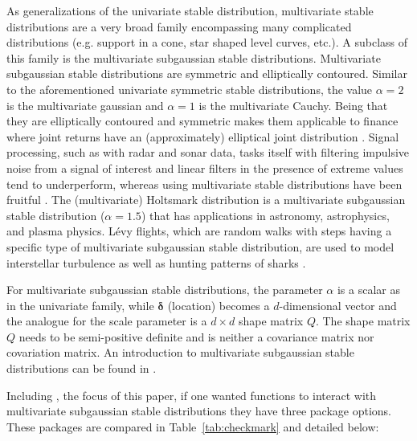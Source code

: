 As generalizations of the univariate stable distribution, multivariate
stable distributions are a very broad family encompassing many
complicated distributions (e.g. support in a cone, star shaped level
curves, etc.).  A subclass of this family is the
multivariate subgaussian stable distributions. Multivariate
subgaussian stable distributions are symmetric and elliptically
contoured.  Similar to the aforementioned univariate symmetric stable
distributions, the value $\alpha=2$ is the multivariate gaussian and
$\alpha=1$ is the multivariate Cauchy.  Being that they are
elliptically contoured and symmetric makes them applicable to finance
where joint returns have an (approximately) elliptical joint
distribution \citep{nolan2020univariate}.  Signal processing, such as
with radar and sonar data, tasks itself with filtering impulsive noise
from a signal of interest and linear filters in the presence of
extreme values tend to underperform, whereas using multivariate stable
distributions have been fruitful \citep{tsakalides1998deviation,
  nolan2013multivariate}.  The (multivariate) Holtsmark distribution
is a multivariate subgaussian stable distribution ($\alpha=1.5$) that
has applications in astronomy, astrophysics, and plasma
physics. L{\'e}vy flights, which are random walks with steps having a
specific type of multivariate subgaussian stable distribution, are
used to model interstellar turbulence as well as hunting patterns of
sharks \citep{boldyrev2003levy, sims2008scaling}.


For multivariate subgaussian stable distributions, the parameter
$\alpha$ is a scalar as in the univariate family, while
$\boldsymbol{\delta}$ (location) becomes a $d$-dimensional vector and
the analogue for the scale parameter is a $d \times d$ shape matrix
$Q$. The shape matrix $Q$ needs to be semi-positive definite and is
neither a covariance matrix nor covariation matrix.  An introduction
to multivariate subgaussian stable distributions can be found in
\citet{nolan2013multivariate}.


Including , the focus of this paper, if one wanted
 functions to interact with multivariate subgaussian stable
distributions they have three  package options. These packages
are compared in Table~\ref{tab:checkmark} and detailed below:

